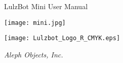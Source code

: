 %
%
%
%
%

\date {}
\thispagestyle{empty}
\begingroup
\centering 

\begin{center}
\fontsize{24pt}{1em}\selectfont LulzBot Mini User Manual
\end{center}

\begin{comment}
\begin{center}
\fontspec{Outage.ttf}\fontsize{24pt}{1em}\selectfont LulzBot TAZ
\texttt{[image: outage-6.png]}
\fontspec{Outage.ttf}\fontsize{24pt}{1em}\selectfont User Manual
\end{center}
\end{comment}

\par




\texttt{[image: mini.jpg]}


\begin{center}
\texttt{[image: Lulzbot\_Logo\_R\_CMYK.eps]}

{\large \itshape Aleph Objects, Inc.}
\end{center}
\endgroup
